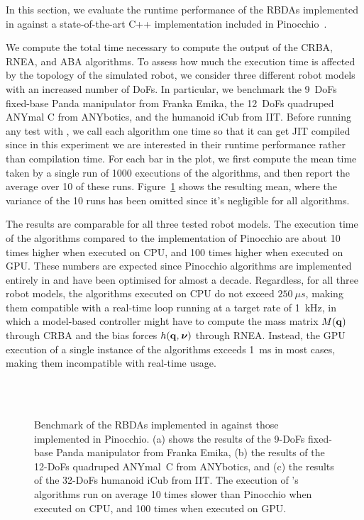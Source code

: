 In this section, we evaluate the runtime performance of the \aclp{RBDA} implemented in \jaxsim against a state-of-the-art C++ implementation included in Pinocchio~\parencite{carpentier_pinocchio_2015, carpentier_pinocchio_2019}.

We compute the total time necessary to compute the output of the \ac{CRBA}, \ac{RNEA}, and \ac{ABA} algorithms.
To assess how much the execution time is affected by the topology of the simulated robot, we consider three different robot models with an increased number of \acp{DoF}.
In particular, we benchmark the 9~\acp{DoF} fixed-base Panda manipulator from Franka Emika, the 12~\acp{DoF} quadruped ANYmal C from ANYbotics, and the humanoid iCub from IIT.
Before running any test with \jaxsim, we call each algorithm one time so that it can get \ac{JIT} compiled since in this experiment we are interested in their runtime performance rather than compilation time.
For each bar in the plot, we first compute the mean time taken by a single run of 1000 executions of the algorithms, and then report the average over 10 of these runs.
Figure~\ref{fig:jaxsim_benchmark_algos} shows the resulting mean, where the variance of the 10 runs has been omitted since it's negligible for all algorithms.

The results are comparable for all three tested robot models.
The execution time of the \jaxsim algorithms compared to the implementation of Pinocchio are about 10 times higher when executed on \ac{CPU}, and 100 times higher when executed on \ac{GPU}.
These numbers are expected since Pinocchio algorithms are implemented entirely in \cpp and have been optimised for almost a decade.
Regardless, for all three robot models, the \jaxsim algorithms executed on \ac{CPU} do not exceed $250~\mu s$, making them compatible with a real-time loop running at a target rate of 1~kHz, in which a model-based controller might have to compute the mass matrix $M(\mathbf{q})$ through \ac{CRBA} and the bias forces $h(\mathbf{q}, \prescript{}{}{\boldsymbol{\nu}})$ through \ac{RNEA}.
Instead, the \ac{GPU} execution of a single instance of the algorithms exceeds 1~ms in most cases, making them incompatible with real-time usage.

\begin{figure}
    \centering
    \\
    \\
    \caption{Benchmark of the \acsp{RBDA} implemented in \jaxsim against those implemented in Pinocchio. (a) shows the results of the 9-\acsp{DoF} fixed-base Panda manipulator from Franka Emika, (b) the results of the 12-\acsp{DoF} quadruped ANYmal~C from ANYbotics, and (c) the results of the 32-\acsp{DoF} humanoid iCub from IIT. The execution of \jaxsim's algorithms run on average 10 times slower than Pinocchio when executed on \acs{CPU}, and 100 times when executed on \acs{GPU}.}
    \label{fig:jaxsim_benchmark_algos}
\end{figure}

